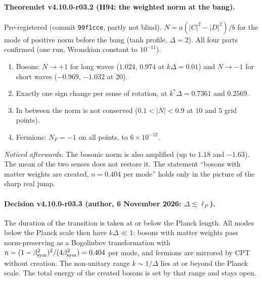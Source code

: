 \paragraph{Theoremlet v4.10.0-r03.2 (H94: the weighted norm at the bang).}
Pre-registered (commit \texttt{99f1cce}, partly not blind).  \(N=a(|C|^2-|D|^2)/b\) for the mode of positive norm before the bang (tanh profile,
\(\Delta=2\)).  All four parts confirmed (one run, Wronskian constant to \(10^{-11}\)).
\begin{enumerate}[leftmargin=2em]
\item[(a)] Bosons: \(N\to+1\) for long waves (\(1.024\), \(0.974\) at \(k\Delta=0.01\)) and \(N\to-1\) for short waves (\(-0.969\), \(-1.032\) at \(20\)).
\item[(b)] Exactly one sign change per sense of rotation, at \(k^*\Delta=0.7361\) and \(0.2569\).
\item[(c)] In between the norm is not conserved (\(0.1<|N|<0.9\) at \(10\) and \(5\) grid points).
\item[(d)] Fermions: \(N_F=-1\) on all points, to \(6\times10^{-12}\).
\end{enumerate}
\emph{Noticed afterwards.}  The bosonic norm is also amplified (up to \(1.18\) and \(-1.63\)).  The mean of the two senses does not restore it.  The
statement ``bosons with matter weights are created, \(n=0.404\) per mode'' holds only in the picture of the sharp real jump.

\paragraph{Decision v4.10.0-r03.3 (author, 6 November 2026: \(\Delta\lesssim\ell_P\)).}
The duration of the transition is taken at or below the Planck length.  All modes below the Planck scale then have \(k\Delta\ll1\): bosons with matter
weights pass norm-preserving as a Bogoliubov transformation with \(n=(1-\beta_{\rm sym}^2)^2/(4\beta_{\rm sym}^2)=0.404\) per mode, and fermions are mirrored
by CPT without creation.  The non-unitary range \(k\sim1/\Delta\) lies at or beyond the Planck scale.  The total energy of the created bosons is set by
that range and stays open.

